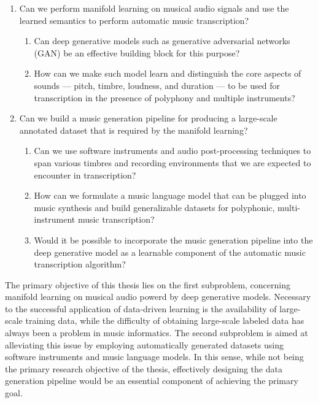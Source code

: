 \begin{enumerate}
	\item Can we perform manifold learning on musical audio signals and use the learned semantics to perform automatic music transcription?
	\begin{enumerate}
		\item Can deep generative models such as generative adversarial networks (GAN) be an effective building block for this purpose?
		\item How can we make such model learn and distinguish the core aspects of sounds --- pitch, timbre, loudness, and duration --- to be used for transcription in the presence of polyphony and multiple instruments?
	\end{enumerate}
	\item Can we build a music generation pipeline for producing a large-scale annotated dataset that is required by the manifold learning?
	\begin{enumerate}
		\item Can we use software instruments and audio post-processing techniques to span various timbres and recording environments that we are expected to encounter in transcription?
		\item How can we formulate a music language model that can be plugged into music synthesis and build generalizable datasets for polyphonic, multi-instrument music transcription?
		\item Would it be possible to incorporate the music generation pipeline into the deep generative model as a learnable component of the automatic music transcription algorithm?
	\end{enumerate}
\end{enumerate}

\vspace{1em}

The primary objective of this thesis lies on the first subproblem, concerning manifold learning on musical audio powerd by deep generative models.
Necessary to the successful application of data-driven learning is the availability of large-scale training data, while the difficulty of obtaining large-scale labeled data has always been a problem in music informatics.
The second subproblem is aimed at alleviating this issue by employing automatically generated datasets using software instruments and music language models.
In this sense, while not being the primary research objective of the thesis, effectively designing the data generation pipeline would be an essential component of achieving the primary goal.


